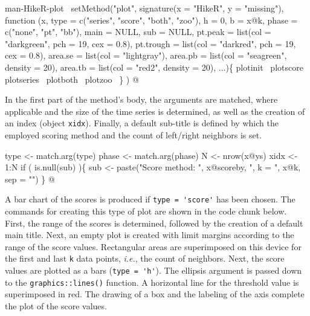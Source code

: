 \documentclass[a4paper]{article}
\begin{document}
\nwenddocs{}\endmoddef
\LA{}man-HikeR-plot~{\nwtagstyle{}}\RA{}
setMethod("plot",
    signature(x = "HikeR", y = "missing"),
    function (x, type = c("series", "score", "both", "zoo"),
              h = 0, b = x@k, phase = c("none", "pt", "bb"),
              main = NULL, sub = NULL,
              pt.peak = list(col = "darkgreen", pch = 19, cex = 0.8),
              pt.trough = list(col = "darkred", pch = 19, cex = 0.8),
              area.se = list(col = "lightgray"),
              area.pb = list(col = "seagreen", density = 20),
              area.tb = list(col = "red2", density = 20),
              ...)\{
        \LA{}plotinit~{\nwtagstyle{}}\RA{}
        \LA{}plotscore~{\nwtagstyle{}}\RA{}
        \LA{}plotseries~{\nwtagstyle{}}\RA{}
        \LA{}plotboth~{\nwtagstyle{}}\RA{}
        \LA{}plotzoo~{\nwtagstyle{}}\RA{}
    \}
)
\nwendcode{}@

In the first part of the method's body, the arguments are matched,
where applicable and the size of the time series is determined, as
well as the creation of an index (object \verb?xidx?). Finally, a default
sub-title is defined by which the employed scoring method and the
count of left/right neighbors is set.

\nwenddocs{}\endmoddef
type <- match.arg(type)
phase <- match.arg(phase)
N <- nrow(x@ys)
xidx <- 1:N
if ( is.null(sub) )\{
    sub <- paste("Score method: ", x@scoreby,
                 ", k = ", x@k, sep = "")
\}
\nwendcode{}@

A bar chart of the scores is produced if \verb?type = 'score'? has been
chosen. The commands for creating this type of plot are shown in the
code chunk below. First, the range of the scores is determined,
followed by the creation of a default main title. Next, an empty plot
is created with limit margins according to the range of the score
values. Rectangular areas are superimposed on this device for the
first and last \verb?k? data points, \emph{i.e.}, the count of neighbors.
Next, the score values are plotted as a bars (\verb?type = 'h'?). The
ellipsis argument is passed down to the \verb?graphics::lines()?
function. A horizontal line for the threshold value is superimposed in
red. The drawing of a box and the labeling of the axis complete the
plot of the score values.
\end{document}
